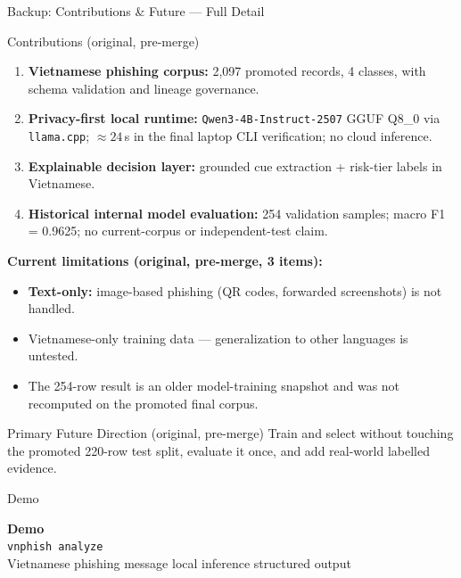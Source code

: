\begin{frame}[allowframebreaks]{Backup: Contributions \& Future --- Full Detail}
  \begin{block}{Contributions (original, pre-merge)}
    {\footnotesize
    \begin{enumerate}
      \item \textbf{Vietnamese phishing corpus:} 2{,}097 promoted records, 4 classes, with schema validation and lineage governance.
      \item \textbf{Privacy-first local runtime:} \texttt{Qwen3-4B-Instruct-2507} GGUF Q8\_0 via \texttt{llama.cpp}; ${\approx}24$\,s in the final laptop CLI verification; no cloud inference.
      \item \textbf{Explainable decision layer:} grounded cue extraction + risk-tier labels in Vietnamese.
      \item \textbf{Historical internal model evaluation:} 254 validation samples; macro F1 = 0.9625; no current-corpus or independent-test claim.
    \end{enumerate}}
  \end{block}
  {\footnotesize\textbf{Current limitations (original, pre-merge, 3 items):}}
  \begin{itemize}\footnotesize
    \item \textbf{Text-only:} image-based phishing (QR codes, forwarded screenshots) is not handled.
    \item Vietnamese-only training data --- generalization to other languages is untested.
    \item The 254-row result is an older model-training snapshot and was not recomputed on the promoted final corpus.
  \end{itemize}
  \begin{block}{Primary Future Direction (original, pre-merge)}
    {\footnotesize Train and select without touching the promoted 220-row test split, evaluate it once, and add real-world labelled evidence.}
  \end{block}
\end{frame}

\begin{frame}{Demo}
  \vfill
  \begin{center}
    {\Huge\bfseries\color{CVBLUE} Demo}\\[16pt]
    {\large \texttt{vnphish analyze}}\\[8pt]
    {\normalsize\color{black!60} Vietnamese phishing message \textrightarrow{} local inference \textrightarrow{} structured output}
  \end{center}
  \vfill
\end{frame}
